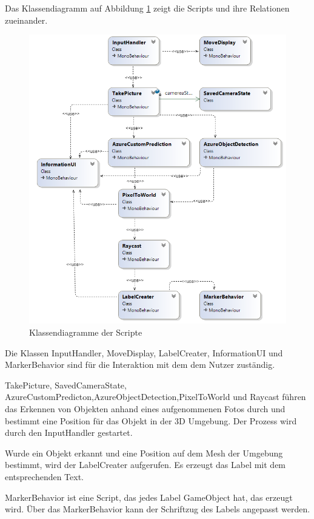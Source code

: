 Das Klassendiagramm auf Abbildung \ref{dia:classdiagramm} zeigt die Scripts und ihre Relationen zueinander.

\begin{figure}[H]
	\centering
	\includegraphics[width=1\textwidth]{images/klassendiagramm.png}
	\caption[]{Klassendiagramme der Scripte}
	\label{dia:classdiagramm}
\end{figure}
 
Die Klassen InputHandler, MoveDisplay, LabelCreater, InformationUI und MarkerBehavior sind für die Interaktion mit dem dem Nutzer zuständig. 

TakePicture, SavedCameraState, AzureCustomPredicton,AzureObjectDetection,PixelToWorld und Raycast führen das Erkennen von Objekten anhand eines aufgenommenen Fotos durch und bestimmt eine Position für das Objekt in der 3D Umgebung. Der Prozess wird durch den InputHandler gestartet. 

Wurde ein Objekt erkannt und eine Position auf dem Mesh der Umgebung bestimmt, wird der LabelCreater aufgerufen. Es erzeugt das Label mit dem entsprechenden Text.

MarkerBehavior ist eine Script, das jedes Label GameObject hat, das erzeugt wird. Über das MarkerBehavior kann der Schriftzug des Labels angepasst werden.

